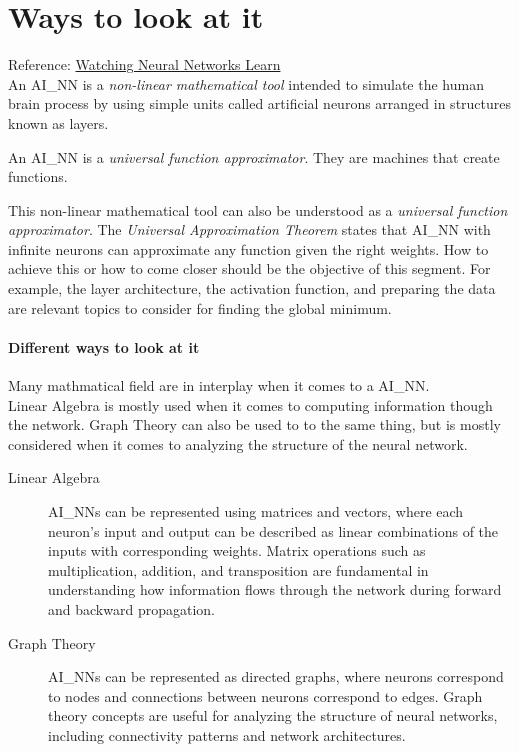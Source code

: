 \section{Ways to look at it}

Reference: \href{https://youtu.be/TkwXa7Cvfr8?si=V8cJG_DQAoA2fndE}{Watching Neural Networks Learn}\\

An \gls{AI_NN} is a \textit{non-linear mathematical tool} intended to simulate the human brain process by using simple units called artificial neurons arranged in structures known as layers.
\begin{center}
	An \gls{AI_NN} is a \textit{universal function approximator}. They are machines that create functions.
\end{center}

This non-linear mathematical tool can also be understood as a \textit{universal function approximator}. The \textit{Universal Approximation Theorem} states that \gls{AI_NN} with infinite neurons can approximate any function given the right weights. How to achieve this or how to come closer should be the objective of this segment. For example, the layer architecture, the activation function, and preparing the data are relevant topics to consider for finding the global minimum.

\paragraph{Different ways to look at it}
Many mathmatical field are in interplay when it comes to a \gls{AI_NN}.\\

Linear Algebra is mostly used when it comes to computing information though the network. Graph Theory can also be used to to the same thing, but is mostly considered when it comes to analyzing the structure of the neural network. 

\begin{description}
	\item[Linear Algebra] \glspl{AI_NN} can be represented using matrices and vectors, where each neuron's input and output can be described as linear combinations of the inputs with corresponding weights. Matrix operations such as multiplication, addition, and transposition are fundamental in understanding how information flows through the network during forward and backward propagation.
	\item[Graph Theory] \glspl{AI_NN} can be represented as directed graphs, where neurons correspond to nodes and connections between neurons correspond to edges. Graph theory concepts are useful for analyzing the structure of neural networks, including connectivity patterns and network architectures.
\end{description}

